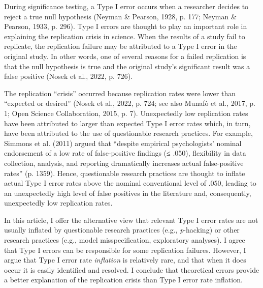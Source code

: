 \documentclass[authordate, meta, issue]{jote-new-article}
\author[1]{\mbox{Mark Rubin\orcid{0000-0002-6483-8561}}}
\affil[1]{Durham University}
\begin{document}
\begin{frontmatter}
  \maketitle
  
  \begin{abstract}
    \printabstracttext


	
  \end{abstract}
  
\end{frontmatter}










	During significance testing, a Type I error occurs when a researcher decides to reject a true null hypothesis (Neyman \& Pearson, 1928, p. 177; Neyman \& Pearson, 1933, p. 296). Type I errors are thought to play an important role in explaining the replication crisis in science. When the results of a study fail to replicate, the replication failure may be attributed to a Type I error in the original study. In other words, one of several reasons for a failed replication is that the null hypothesis is true and the original study's significant result was a false positive (Nosek et al., 2022, p. 726).



	The replication “crisis” occurred because replication rates were lower than “expected or desired” (Nosek et al., 2022, p. 724; see also Munafò et al., 2017, p. 1; Open Science Collaboration, 2015, p. 7). Unexpectedly low replication rates have been attributed to larger than expected Type I error rates which, in turn, have been attributed to the use of questionable research practices. For example, Simmons et al. (2011) argued that “despite empirical psychologists' nominal endorsement of a low rate of false-positive findings (≤ .050), flexibility in data collection, analysis, and reporting dramatically increases actual false-positive rates” (p. 1359). Hence, questionable research practices are thought to inflate actual Type I error rates above the nominal conventional level of .050, leading to an unexpectedly high level of false positives in the literature and, consequently, unexpectedly low replication rates.



	In this article, I offer the alternative view that relevant Type I error rates are not usually inflated by questionable research practices (e.g., \emph{p}-hacking) or other research practices (e.g., model misspecification, exploratory analyses). I agree that Type I errors can be responsible for some replication failures. However, I argue that Type I error rate \emph{inflation} is relatively rare, and that when it does occur it is easily identified and resolved. I conclude that theoretical errors provide a better explanation of the replication crisis than Type I error rate inflation.
\end{document}
